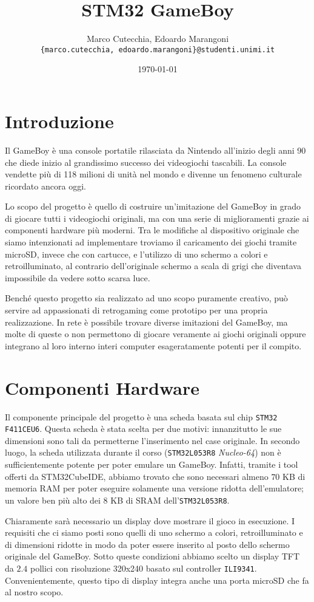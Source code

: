 \documentclass[12pt]{article}
\title{STM32 GameBoy}
\date{\today}
\author{Marco Cutecchia, Edoardo Marangoni \\
\footnotesize \texttt{\{marco.cutecchia, edoardo.marangoni\}@studenti.unimi.it} \\ }
\begin{document}
\maketitle

\section{Introduzione}
Il GameBoy è una console portatile rilasciata da Nintendo all'inizio degli anni
90 che diede inizio al grandissimo successo dei videogiochi tascabili.
La console vendette più di 118 milioni di unità nel mondo e divenne un fenomeno
culturale ricordato ancora oggi.

Lo scopo del progetto è quello di costruire un'imitazione del GameBoy in grado
di giocare tutti i videogiochi originali, ma con una serie di miglioramenti
grazie ai componenti hardware più moderni.
Tra le modifiche al dispositivo originale che siamo intenzionati ad implementare
troviamo il caricamento dei giochi tramite microSD, invece che con cartucce,
e l'utilizzo di uno schermo a colori e retroilluminato, al contrario dell'originale
schermo a scala di grigi che diventava impossibile da vedere sotto scarsa luce.

Benché questo progetto sia realizzato ad uno scopo puramente creativo, può
servire ad appassionati di retrogaming come prototipo per una propria
realizzazione.
In rete è possibile trovare diverse imitazioni del GameBoy, ma molte di
queste o non permettono di giocare veramente ai giochi originali oppure
integrano al loro interno interi computer esageratamente potenti per il
compito.

\section{Componenti Hardware}
Il componente principale del progetto è una scheda basata sul chip
\texttt{STM32 F411CEU6}.
Questa scheda è stata scelta per due motivi: innanzitutto le sue dimensioni sono
tali da permetterne l'inserimento nel case originale.
In secondo luogo, la scheda utilizzata durante il corso
(\texttt{STM32L053R8} \textit{Nucleo-64}) non è sufficientemente potente per
poter emulare un GameBoy.
Infatti, tramite i tool offerti da STM32CubeIDE, abbiamo trovato che sono
necessari almeno $70$ KB di memoria RAM per poter eseguire solamente una versione
ridotta dell'emulatore; un valore ben più alto dei $8$ KB di SRAM
dell'\texttt{STM32L053R8}.

Chiaramente sarà necessario un display dove mostrare il gioco in esecuzione.
I requisiti che ci siamo posti sono quelli di uno schermo a colori,
retroilluminato e di dimensioni ridotte in modo da poter essere inserito
al posto dello schermo originale del GameBoy.
Sotto queste condizioni abbiamo scelto un display TFT da $2.4$ pollici con
risoluzione 320x240 basato sul controller \texttt{ILI9341}.
Convenientemente, questo tipo di display integra anche una porta microSD
che fa al nostro scopo.
\end{document}
